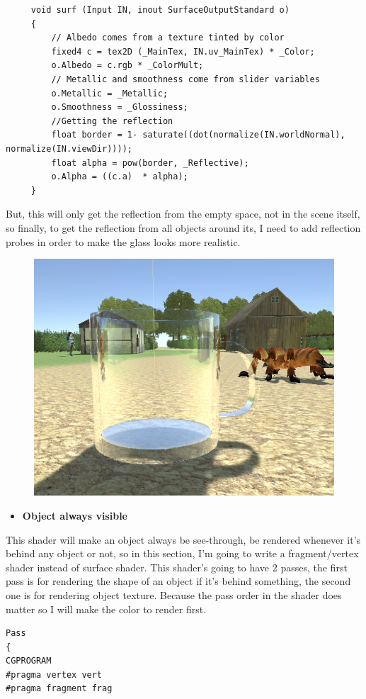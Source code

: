 \documentclass[a4paper, 13pt]{extarticle}
\begin{document}
{\begin{figure}[h]
  	\end{figure}
     \begin{lstlisting}
     void surf (Input IN, inout SurfaceOutputStandard o)
     {
	     // Albedo comes from a texture tinted by color
	     fixed4 c = tex2D (_MainTex, IN.uv_MainTex) * _Color;
	     o.Albedo = c.rgb * _ColorMult;
	     // Metallic and smoothness come from slider variables
	     o.Metallic = _Metallic;
	     o.Smoothness = _Glossiness;
	     //Getting the reflection
	     float border = 1- saturate((dot(normalize(IN.worldNormal), normalize(IN.viewDir))));
	     float alpha = pow(border, _Reflective);
	     o.Alpha = ((c.a)  * alpha);
     }
      \end{lstlisting}
      But, this will only get the reflection from the empty space, not in the scene itself, so finally, to get the reflection from all objects around its, I need to add reflection probes in order to make the glass looks more realistic.
      \begin{figure}[h]
      	\begin{minipage}{1\textwidth}
      		\centering
      		\includegraphics[width=0.4\linewidth]{intructions/reflection_probe.png}
      		\centering
      		\label{fig:test32}
      	\end{minipage}      	
      \end{figure}
  \begin{itemize}
 	\item \bfseries Object always visible 
  \end{itemize}
This shader will make an object always be see-through, be rendered whenever it's behind any object or not, so in this section, I'm going to write a fragment/vertex shader instead of surface shader. This shader's going to have 2 passes, the first pass is for rendering the shape of an object if it's behind something, the second one is for rendering object texture. Because the pass order in the shader does matter so I will make the color to render first. 

\begin{lstlisting}
Pass
{
CGPROGRAM
#pragma vertex vert
#pragma fragment frag


\end{lstlisting}}
\end{document}
